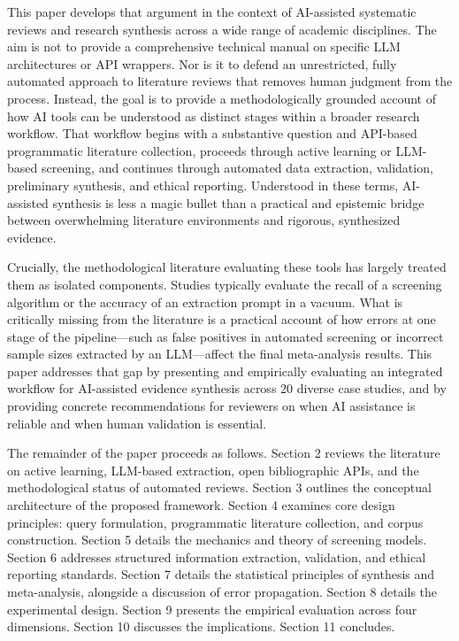 \documentclass[12pt]{article}
\begin{document}
This paper develops that argument in the context of AI-assisted systematic reviews and research synthesis across a wide range of academic disciplines. The aim is not to provide a comprehensive technical manual on specific LLM architectures or API wrappers. Nor is it to defend an unrestricted, fully automated approach to literature reviews that removes human judgment from the process. Instead, the goal is to provide a methodologically grounded account of how AI tools can be understood as distinct stages within a broader research workflow. That workflow begins with a substantive question and API-based programmatic literature collection, proceeds through active learning or LLM-based screening, and continues through automated data extraction, validation, preliminary synthesis, and ethical reporting. Understood in these terms, AI-assisted synthesis is less a magic bullet than a practical and epistemic bridge between overwhelming literature environments and rigorous, synthesized evidence.

Crucially, the methodological literature evaluating these tools has largely treated them as isolated components. Studies typically evaluate the recall of a screening algorithm or the accuracy of an extraction prompt in a vacuum. What is critically missing from the literature is a practical account of how errors at one stage of the pipeline---such as false positives in automated screening or incorrect sample sizes extracted by an LLM---affect the final meta-analysis results. This paper addresses that gap by presenting and empirically evaluating an integrated workflow for AI-assisted evidence synthesis across 20 diverse case studies, and by providing concrete recommendations for reviewers on when AI assistance is reliable and when human validation is essential.

The remainder of the paper proceeds as follows. Section 2 reviews the literature on active learning, LLM-based extraction, open bibliographic APIs, and the methodological status of automated reviews. Section 3 outlines the conceptual architecture of the proposed framework. Section 4 examines core design principles: query formulation, programmatic literature collection, and corpus construction. Section 5 details the mechanics and theory of screening models. Section 6 addresses structured information extraction, validation, and ethical reporting standards. Section 7 details the statistical principles of synthesis and meta-analysis, alongside a discussion of error propagation. Section 8 details the experimental design. Section 9 presents the empirical evaluation across four dimensions. Section 10 discusses the implications. Section 11 concludes.
\end{document}
